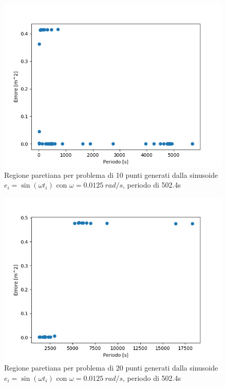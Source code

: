 \documentclass[a4paper,12pt]{report}
\begin{document}
\begin{figure}[H]
  \centering
  \includegraphics[scale=0.67]{img/puls0125/init_10.png}
  \caption{Regione paretiana per problema di 10 punti generati dalla sinusoide \newline $e_i = \sin(\omega t_i)$ con $\omega = 0.0125~rad/s$, periodo di 502.4s}
  \label{fig:init_0125_10}
\end{figure}

\begin{figure}[H]
  \centering
  \includegraphics[scale=0.67]{img/puls0125/init_20.png}
  \caption{Regione paretiana per problema di 20 punti generati dalla sinusoide \newline $e_i = \sin(\omega t_i)$ con $\omega = 0.0125~rad/s$, periodo di 502.4s}
  \label{fig:init_0125_20}
\end{figure}
\end{document}
